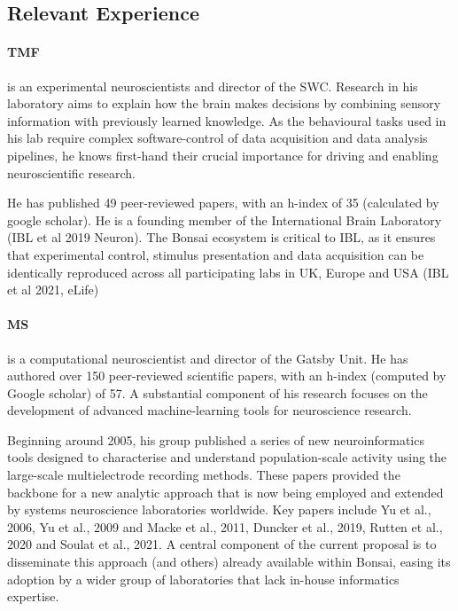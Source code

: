 
\subsection{Relevant Experience}

\paragraph{TMF} is an experimental
neuroscientists and director of the SWC. Research in his laboratory aims to
explain how the brain makes decisions by combining sensory information with
previously learned knowledge.  As the behavioural tasks used in his lab require
complex software-control of data acquisition and data analysis pipelines, he
knows first-hand their crucial importance for driving and enabling
neuroscientific research.

He has published 49 peer-reviewed papers, with an h-index of 35 (calculated by
google scholar).  He is a founding member of the International Brain Laboratory
(IBL et al 2019 Neuron). The Bonsai ecosystem is critical to IBL, as it ensures
that experimental control, stimulus presentation and data acquisition can be
identically reproduced across all participating labs in UK, Europe and USA (IBL
et al 2021, eLife)

\paragraph{MS} is a computational neuroscientist and director of the Gatsby
Unit. He has authored over 150 peer-reviewed scientific papers, with an h-index
(computed by Google scholar) of 57. A substantial component of his research
focuses on the development of advanced machine-learning tools for
neuroscience research.

Beginning around 2005, his group published a series of new neuroinformatics
tools designed to characterise and understand population-scale activity using
the large-scale multielectrode recording methods. These papers
provided the backbone for a new analytic approach that is now being employed
and extended by systems neuroscience laboratories worldwide.
%
Key papers include Yu et al., 2006, Yu et al., 2009 and Macke et al., 2011,
Duncker et al., 2019, Rutten et al., 2020 and Soulat et al., 2021.
%
A central component of the current proposal is to disseminate this approach
(and others) already available within Bonsai, easing its adoption by a wider
group of laboratories that lack in-house informatics expertise.

